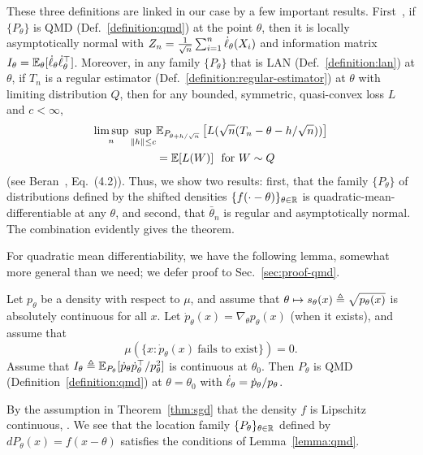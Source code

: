 These three definitions are linked in our case by a few important results.
First~\cite[Theorem 7.2]{VanDerVaart98}, if $\{P_\theta\}$ is QMD
(Def.~\ref{definition:qmd}) at the point $\theta$, then it is locally
asymptotically normal with $Z_n = \frac{1}{\sqrt{n}} \sum_{i = 1}^n
\dot{\ell}_\theta(X_i)$ and information matrix $I_\theta =
\mathbb{E}_\theta[\dot{\ell}_\theta \dot{\ell}_\theta^\top]$. Moreover, in any family
$\{P_\theta\}$ that is LAN (Def.~\ref{definition:lan}) at $\theta$, if $T_n$
is a regular estimator (Def.~\ref{definition:regular-estimator}) at $\theta$
with limiting distribution $Q$, then for any bounded, symmetric,
quasi-convex loss $L$ and $c < \infty$,
\begin{align}
  \limsup_n \sup_{\left\|{h}\right\| \le c}
  & \mathbb{E}_{P_{\theta + h/\sqrt{n}}}
  \left[L(\sqrt{n}(T_n - \theta - h / \sqrt{n}))\right] \nonumber \\
  & = \mathbb{E}[L(W)] ~~ \mbox{for~}W \sim Q \label{eqn:limit-law-regular}
\end{align}
(see Beran~\cite{beran1995role}, Eq.~(4.2)).
%
Thus, we show two results: first,
that the family $\{P_\theta\}$ of distributions
defined by the shifted densities $\{f(\cdot - \theta)\}_{\theta \in \mathbb{R}}$
is quadratic-mean-differentiable at any $\theta$,
and second, that $\bar{\theta}_n$ is regular and
asymptotically normal.
The combination evidently gives the theorem.

For quadratic mean differentiability, we have the following lemma, somewhat
more general than we need; we defer proof to Sec.~\ref{sec:proof-qmd}.
\begin{lemma}
  \label{lemma:qmd}
  Let $p_\theta$ be a density with respect to $\mu$,
  and assume that $\theta \mapsto s_\theta(x) \triangleq \sqrt{p_\theta(x)}$
  is absolutely continuous for all $x$. Let
  $\dot{p}_\theta(x) = \nabla_\theta p_\theta(x)$ (when it exists),
  and assume that
  \begin{equation*}
    \mu(\{x : \dot{p}_\theta(x) ~ \mbox{fails~to~exist}\}) = 0.
  \end{equation*}
  Assume that $I_\theta \triangleq \mathbb{E}_{P_\theta}[\dot{p}_\theta
    \dot{p}_\theta^\top / p_\theta^2]$ is continuous at $\theta_0$. Then
  $P_\theta$ is QMD (Definition~\ref{definition:qmd}) at $\theta = \theta_0$
  with $\dot{\ell}_\theta = \dot{p}_\theta / p_\theta$.
\end{lemma}

By the assumption in Theorem~\ref{thm:sgd} that the density $f$
is Lipschitz continuous, . We see that the location family
$\{P_\theta\}_{\theta \in \mathbb{R}}$ defined by $dP_\theta(x) = f(x - \theta)$
satisfies the conditions of Lemma~\ref{lemma:qmd}.

